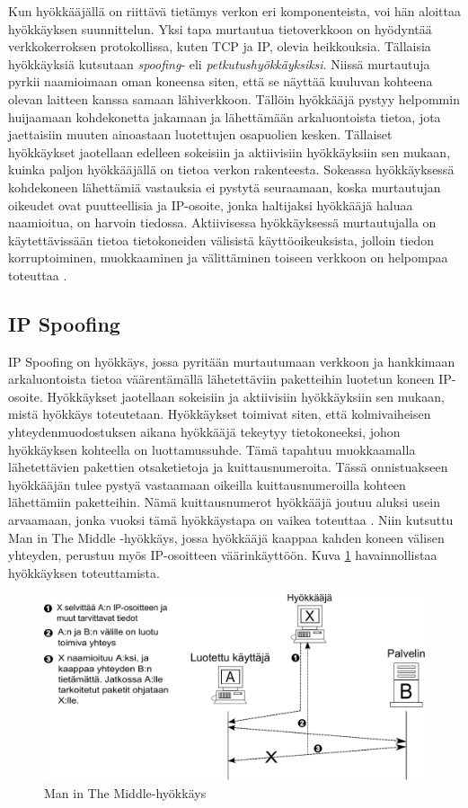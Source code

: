 Kun hyökkääjällä on riittävä tietämys verkon eri komponenteista, voi
hän aloittaa hyökkäyksen suunnittelun. Yksi tapa murtautua
tietoverkkoon on hyödyntää verkkokerroksen protokollissa, kuten TCP ja
IP, olevia heikkouksia. Tällaisia hyökkäyksiä kutsutaan
\textit{spoofing}- eli \textit{petkutushyökkäyksiksi}. Niissä
murtautuja pyrkii naamioimaan oman koneensa siten, että se näyttää
kuuluvan kohteena olevan laitteen kanssa samaan lähiverkkoon.  Tällöin
hyökkääjä pystyy helpommin huijaamaan kohdekonetta jakamaan ja
lähettämään arkaluontoista tietoa, jota jaettaisiin muuten ainoastaan
luotettujen osapuolien kesken.  Tällaiset hyökkäykset jaotellaan
edelleen sokeisiin ja aktiivisiin hyökkäyksiin sen mukaan, kuinka
paljon hyökkääjällä on tietoa verkon rakenteesta. Sokeassa
hyökkäyksessä kohdekoneen lähettämiä vastauksia ei pystytä seuraamaan,
koska murtautujan oikeudet ovat puutteellisia ja IP-osoite, jonka
haltijaksi hyökkääjä haluaa naamioitua, on harvoin tiedossa.
Aktiivisessa hyökkäyksessä murtautujalla on käytettävissään tietoa
tietokoneiden välisistä käyttöoikeuksista, jolloin tiedon
korruptoiminen, muokkaaminen ja välittäminen toiseen verkkoon on
helpompaa toteuttaa \cite{WEBS}.

\subsection{IP Spoofing}

IP Spoofing on hyökkäys, jossa pyritään murtautumaan verkkoon ja
hankkimaan arkaluontoista tietoa väärentämällä lähetettäviin
paketteihin luotetun koneen IP-osoite. Hyökkäykset jaotellaan
sokeisiin ja aktiivisiin hyökkäyksiin sen mukaan, mistä hyökkäys
toteutetaan. Hyökkäykset toimivat siten, että kolmivaiheisen
yhteydenmuodostuksen aikana hyökkääjä tekeytyy tietokoneeksi, johon
hyökkäyksen kohteella on luottamussuhde. Tämä tapahtuu muokkaamalla
lähetettävien pakettien otsaketietoja ja kuittausnumeroita. Tässä
onnistuakseen hyökkääjän tulee pystyä vastaamaan oikeilla
kuittausnumeroilla kohteen lähettämiin paketteihin. Nämä
kuittausnumerot hyökkääjä joutuu aluksi usein arvaamaan, jonka vuoksi
tämä hyökkäystapa on vaikea toteuttaa \cite{WEBS}. Niin kutsuttu Man
in The Middle -hyökkäys, jossa hyökkääjä kaappaa kahden koneen välisen
yhteyden, perustuu myös IP-\-osoitteen väärinkäyttöön. Kuva \ref{Man}
havainnollistaa hyökkäyksen toteuttamista.

\begin{figure}[ht]
\centering
\includegraphics[width=13cm]{pics/MiTM.pdf}
\caption{Man in The Middle-hyökkäys}
\label{Man}
\end{figure}

